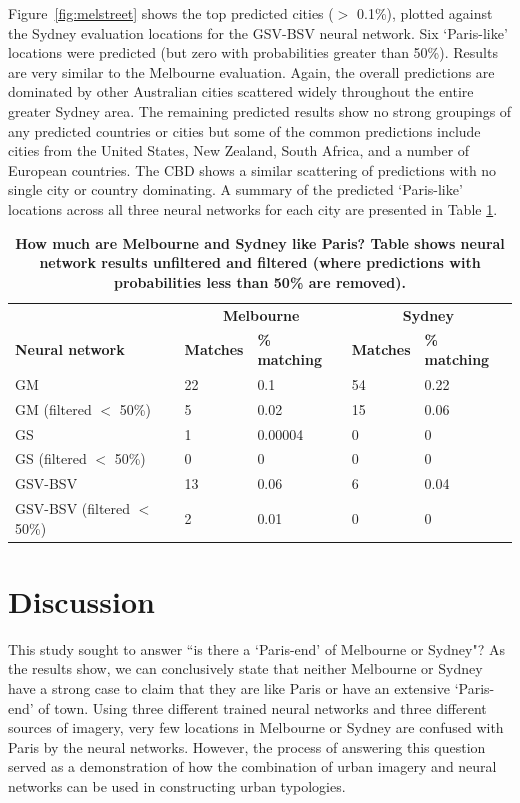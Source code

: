 \documentclass[urbansci,article,submit,moreauthors,pdftex]{Definitions/mdpi}
\begin{document}
Figure~\ref{fig:melstreet} shows the top predicted cities ($>$ 0.1\%), plotted against the Sydney evaluation locations for the GSV-BSV neural network. Six `Paris-like' locations were predicted (but zero with probabilities greater than 50\%). Results are very similar to the Melbourne evaluation. Again, the overall predictions are dominated by other Australian cities scattered widely throughout the entire greater Sydney area. The remaining predicted results show no strong groupings of any predicted countries or cities but some of the common predictions include cities from the United States, New Zealand, South Africa, and a number of European countries. The CBD shows a similar scattering of predictions with no single city or country dominating. A summary of the predicted `Paris-like' locations across all three neural networks for each city are presented in Table \ref{tab:melbournesydneyparis}.

\begin{table}[!htbp]
\caption{\bf How much are Melbourne and Sydney like Paris? Table shows neural network results unfiltered and filtered (where predictions with probabilities less than 50\% are removed).  \label{tab:melbournesydneyparis}}     
\begin{tabular}{ l  l l l  l}
 \hline    &  \multicolumn{2}{c}{\textbf{Melbourne}} & \multicolumn{2}{c}{\textbf{Sydney}}  \\  
\textbf{Neural network} & \textbf{Matches} & \textbf{\% matching}  & \textbf{Matches} & \textbf{\% matching}\\ \hline
GM & 22 & 0.1 & 54 & 0.22 \\ 
GM (filtered $<$ 50\%) & 5 & 0.02 & 15 & 0.06 \\ 
GS & 1 & 0.00004 & 0 & 0 \\ 
GS (filtered $<$ 50\%)& 0 & 0 & 0 & 0 \\ 
GSV-BSV & 13 & 0.06 & 6 & 0.04 \\ 
GSV-BSV (filtered $<$ 50\%)& 2 & 0.01 & 0 & 0\\
\hline
\end{tabular}
\end{table}


\section{Discussion}\label{sec:discussion}

This study sought to answer ``is there a `Paris-end' of Melbourne or Sydney"? As the results show, we can conclusively state that neither Melbourne or Sydney have a strong case to claim that they are like Paris or have an extensive `Paris-end' of town. Using three different trained neural networks and three different sources of imagery, very few locations in Melbourne or Sydney are confused with Paris by the neural networks. However, the process of answering this question served as a demonstration of how the combination of urban imagery and neural networks can be used in constructing urban typologies.
\end{document}
